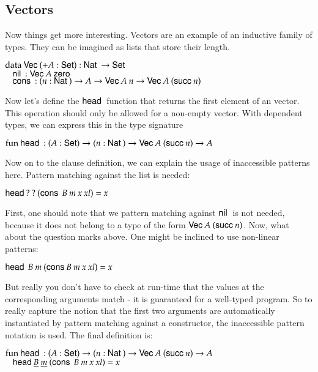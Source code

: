 \subsection{Vectors}
Now things get more interesting. Vectors are an example of an inductive family of types.
They can be imagined as lists that store their length.
\begin{bsp}
$\mathrm{data}\: \mathsf{Vec}\: ( + A : \mathsf{Set} ) : \mathsf{Nat}\: \rightarrow \mathsf{Set} $ \\
$\hspace*{3mm} \mathsf{nil}\: : \mathsf{Vec}\: A \: \mathsf{zero}\:  $\\
$ \hspace*{3mm} \mathsf{cons}\: : ( n : \mathsf{Nat}\: ) \rightarrow{ A \rightarrow\mathsf{Vec}\:A \: n \rightarrow\mathsf{Vec}\:A \: (\mathsf{succ}\:n)} $
\end{bsp}
Now let's define the $\mathsf{head}\:$ function that returns the first element of an vector. This operation should only be allowed for a non-empty vector.
With dependent types, we can express this in the type signature
\begin{bsp}
$ \mathrm{fun}\: \mathsf{head}\: : ( A : \mathsf{Set} ) \rightarrow ( n : \mathsf{Nat}\: ) \rightarrow \mathsf{Vec}\: A \: (\mathsf{succ}\: n) \rightarrow A $
\end{bsp}
Now on to the clause definition, we can explain the usage of inaccessible patterns here.
Pattern matching against the list is needed:
\begin{bsp}
$\mathsf{head}\: ? \: ? \: (\mathsf{cons}\: \: B \: m \: x \: xl) = x $
\end{bsp}
First, one should note that we pattern matching against $\mathsf{nil}\:$ is not needed, because it does not belong to
a type of the form $\mathsf{Vec}\: A \: (\mathsf{succ}\: n)$.
Now, what about the question marks above. 
One might be inclined to use non-linear patterns:
\begin{bsp}
$\mathsf{head}\: \: B \: m \: (\mathsf{cons}\:  B \: m \: x \: xl) = x $
\end{bsp}
But really you don't have to check at run-time that the values at the corresponding arguments match - it is guaranteed for a well-typed program.
So to really capture the notion that the first two arguments are automatically instantiated by pattern matching against a constructor, the inaccessible pattern notation is used. The final definition is:
\begin{bsp}
$ \mathrm{fun}\: \mathsf{head}\: : ( A : \mathsf{Set} ) \rightarrow ( n : \mathsf{Nat}\: ) \rightarrow \mathsf{Vec}\: A \: (\mathsf{succ}\: n) \rightarrow A $\\
$ \hspace*{3mm} \mathsf{head}\: \underline{B} \: \underline{m} \: (\mathsf{cons}\: \: B \: m \: x \: xl) = x $
\end{bsp}
